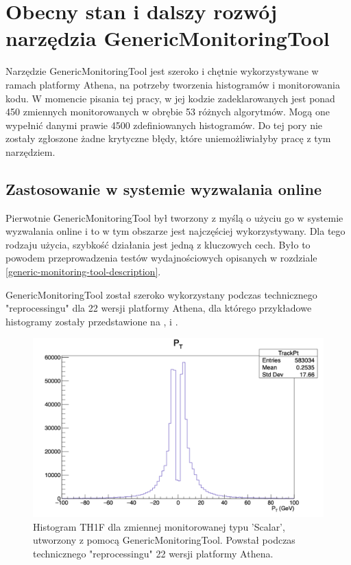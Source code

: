 \section{Obecny stan i dalszy rozwój narzędzia GenericMonitoringTool}
Narzędzie GenericMonitoringTool jest szeroko i chętnie wykorzystywane w ramach platformy Athena, na potrzeby tworzenia histogramów i monitorowania kodu.
W momencie pisania tej pracy, w jej kodzie zadeklarowanych jest ponad 450 zmiennych monitorowanych w obrębie 53 różnych algorytmów. 
Mogą one wypełnić danymi prawie 4500 zdefiniowanych histogramów.
Do tej pory nie zostały zgłoszone żadne krytyczne błędy, które uniemożliwiałyby pracę z tym narzędziem.

\subsection{Zastosowanie w systemie wyzwalania online}
Pierwotnie GenericMonitoringTool był tworzony z myślą o użyciu go w systemie wyzwalania online i to w tym obszarze jest najczęściej wykorzystywany. 
Dla tego rodzaju użycia, szybkość działania jest jedną z kluczowych cech. 
Było to powodem przeprowadzenia testów wydajnościowych opisanych w rozdziale \ref{generic-monitoring-tool-description}.

GenericMonitoringTool został szeroko wykorzystany podczas technicznego "reprocessingu" dla 22 wersji platformy Athena, dla którego przykładowe histogramy zostały przedstawione na ,  i .

\begin{figure}[!ht]
\centering
\includegraphics[width=1\textwidth]{img/histogram_TH1.png}
\caption{
Histogram TH1F dla zmiennej monitorowanej typu 'Scalar', utworzony z pomocą GenericMonitoringTool. Powstał podczas technicznego "reprocessingu" 22 wersji platformy Athena.
}
\label{fig:athena:histogram_TH1}
\end{figure}

